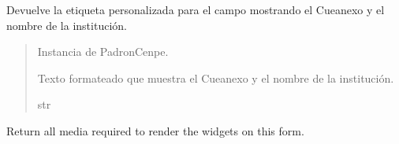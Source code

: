 \documentclass[letterpaper,10pt,spanish]{sphinxmanual}
\begin{document}
\begin{fulllineitems}
\begin{fulllineitems}

\pysigstartsignatures
{}
\pysigstopsignatures
\sphinxAtStartPar
Devuelve la etiqueta personalizada para el campo  mostrando el Cueanexo y el nombre de la institución.
\begin{quote}\begin{description}
\sphinxAtStartPar
{} \textendash{} Instancia de PadronCenpe.

\sphinxAtStartPar
Texto formateado que muestra el Cueanexo y el nombre de la institución.

\sphinxAtStartPar
str

\end{description}\end{quote}

\end{fulllineitems}



\begin{fulllineitems}

\pysigstartsignatures
{}
\pysigstopsignatures
\sphinxAtStartPar
Return all media required to render the widgets on this form.

\end{fulllineitems}


\end{fulllineitems}
\end{document}
